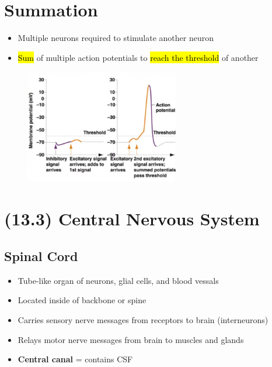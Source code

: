 \documentclass[a4paper,12pt]{article}
\begin{document}
\section{Summation}
\begin{itemize}
    \item{Multiple neurons required to stimulate another neuron}
    \item{\hl{Sum} of multiple action potentials to \hl{reach the threshold} of another}
\end{itemize}
\begin{figure}[H]
    \centering
    \includegraphics[width=0.6\textwidth]{summation}
\end{figure}

\section{(13.3) Central Nervous System}

\subsection{Spinal Cord}
\begin{itemize}
    \item{Tube-like organ of neurons, glial cells, and blood vessals}
    \item{Located inside of backbone or spine}
    \item{Carries sensory nerve messages from receptors to brain (interneurons)}
    \item{Relays motor nerve messages from brain to muscles and glands}
    \item{\textbf{Central canal} = contains CSF}
\end{itemize}
\end{document}
